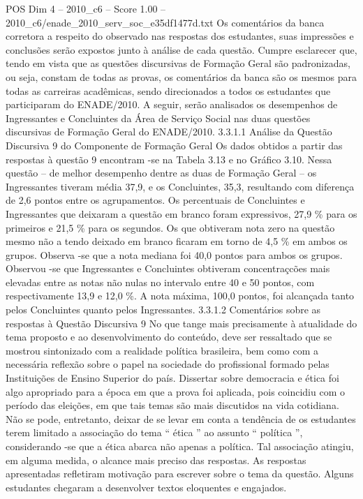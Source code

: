 \begin{textsample}{POS Dim 4 – 2010\_c6 – Score 1.00 – 2010\_c6/enade\_2010\_serv\_soc\_e35df1477d.txt}
Os comentários da banca corretora a respeito do observado nas respostas dos estudantes, suas impressões e conclusões serão expostos junto à análise de cada questão.
Cumpre esclarecer que, tendo em vista que as questões discursivas de Formação Geral são padronizadas, ou seja, constam de todas as provas, os comentários da banca são os mesmos para todas as carreiras acadêmicas, sendo direcionados a todos os estudantes que participaram do ENADE/2010.
A seguir, serão analisados os desempenhos de Ingressantes e Concluintes da Área de Serviço Social nas duas questões discursivas de Formação Geral do ENADE/2010. 3.3.1.1 Análise da Questão Discursiva 9 do Componente de Formação Geral Os dados obtidos a partir das respostas à questão 9 encontram -se na Tabela 3.13 e no Gráfico 3.10.
Nessa questão – de melhor desempenho dentre as duas de Formação Geral – os Ingressantes tiveram média 37,9, e os Concluintes, 35,3, resultando com diferença de 2,6 pontos entre os agrupamentos.
Os percentuais de Concluintes e Ingressantes que deixaram a questão em branco foram expressivos, 27,9 \% para os primeiros e 21,5 \% para os segundos.
Os que obtiveram nota zero na questão mesmo não a tendo deixado em branco ficaram em torno de 4,5 \% em ambos os grupos.
Observa -se que a nota mediana foi 40,0 pontos para ambos os grupos.
Observou -se que Ingressantes e Concluintes obtiveram concentraçcões mais elevadas entre as notas não nulas no intervalo entre 40 e 50 pontos, com respectivamente 13,9 e 12,0 \%.
A nota máxima, 100,0 pontos, foi alcançada tanto pelos Concluintes quanto pelos Ingressantes. 3.3.1.2 Comentários sobre as respostas à Questão Discursiva 9 No que tange mais precisamente à atualidade do tema proposto e ao desenvolvimento do conteúdo, deve ser ressaltado que se mostrou sintonizado com a realidade política brasileira, bem como com a necessária reflexão sobre o papel na sociedade do profissional formado pelas Instituições de Ensino Superior do país.
Dissertar sobre democracia e ética foi algo apropriado para a época em que a prova foi aplicada, pois coincidiu com o período das eleições, em que tais temas são mais discutidos na vida cotidiana.
Não se pode, entretanto, deixar de se levar em conta a tendência de os estudantes terem limitado a associação do tema “ ética ” ao assunto “ política ”, considerando -se que a ética abarca não apenas a política.
Tal associação atingiu, em alguma medida, o alcance mais preciso das respostas.
As respostas apresentadas refletiram motivação para escrever sobre o tema da questão.
Alguns estudantes chegaram a desenvolver textos eloquentes e engajados.

\end{textsample}
